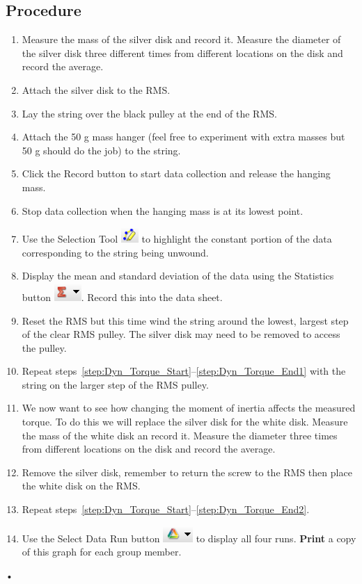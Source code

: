 \documentclass[main.tex]{subfiles}
\begin{document}
\subsection*{Procedure}
\begin{enumerate}
\item
Measure the mass of the silver disk and record it. Measure the diameter of the silver disk three different times from different locations on the disk and record the average.
\item \label{step:Dyn_Torque_Start}
Attach the silver disk to the RMS.
\item
Lay the string over the black pulley at the end of the RMS.
\item
Attach the 50 g mass hanger (feel free to experiment with extra masses but 50 g should do the job) to the string.
\item
Click the Record button to start data collection and release the hanging mass.
\item
Stop data collection when the hanging mass is at its lowest point.
\item
Use the Selection Tool \includegraphics{Selection_Tool} to highlight the constant portion of the data corresponding to the string being unwound.
\item \label{step:Dyn_Torque_End1}
Display the mean and standard deviation of the data using the Statistics button \includegraphics{Statistics}. Record this into the data sheet.
\item 
Reset the RMS but this time wind the string around the lowest, largest step of the clear RMS pulley. The silver disk may need to be removed to access the pulley.
\item \label{step:Dyn_Torque_End2}
Repeat steps~\ref{step:Dyn_Torque_Start}--\ref{step:Dyn_Torque_End1} with the string on the larger step of the RMS pulley.
\item
We now want to see how changing the moment of inertia affects the measured torque. To do this we will replace the silver disk for the white disk. Measure the mass of the white disk an record it. Measure the diameter three times from different locations on the disk and record the average.
\item
Remove the silver disk, remember to return the screw to the RMS then place the white disk on the RMS.
\item
Repeat steps~\ref{step:Dyn_Torque_Start}--\ref{step:Dyn_Torque_End2}.
\item
Use the Select Data Run button \includegraphics{Select_Data_Run} to display all four runs. \textbf{Print} a copy of this graph for each group member.
\end{enumerate}•
\end{document}
